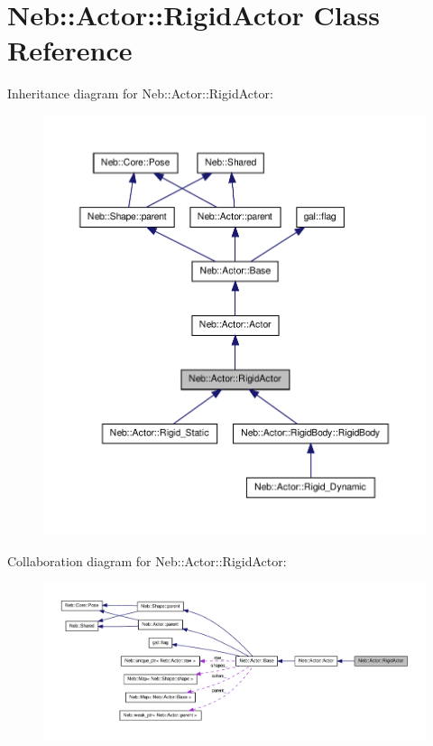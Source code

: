 \hypertarget{classNeb_1_1Actor_1_1RigidActor}{\section{\-Neb\-:\-:\-Actor\-:\-:\-Rigid\-Actor \-Class \-Reference}
\label{classNeb_1_1Actor_1_1RigidActor}
}


\-Inheritance diagram for \-Neb\-:\-:\-Actor\-:\-:\-Rigid\-Actor\-:
\nopagebreak
\begin{figure}[H]
\begin{center}
\leavevmode
\includegraphics[width=350pt]{classNeb_1_1Actor_1_1RigidActor__inherit__graph}
\end{center}
\end{figure}


\-Collaboration diagram for \-Neb\-:\-:\-Actor\-:\-:\-Rigid\-Actor\-:
\nopagebreak
\begin{figure}[H]
\begin{center}
\leavevmode
\includegraphics[width=350pt]{classNeb_1_1Actor_1_1RigidActor__coll__graph}
\end{center}
\end{figure}
